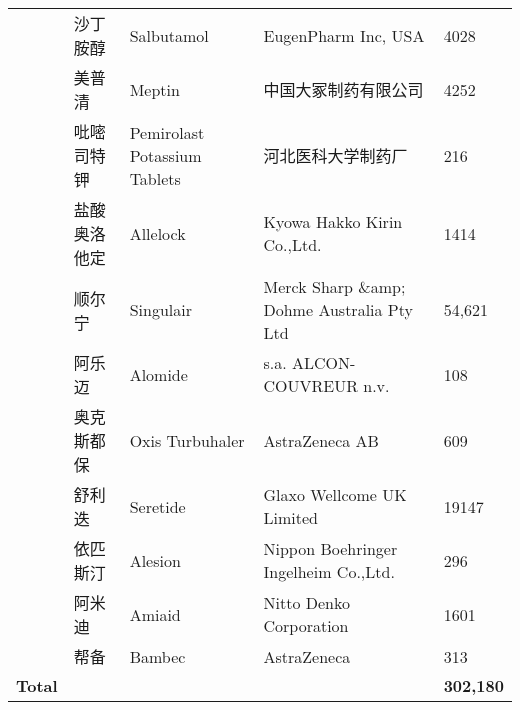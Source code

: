 \begin{longtable}{m{}m{}m{}m{}m{}}
		& 沙丁胺醇 & Salbutamol & EugenPharm Inc, USA & 4028 \\
		& 美普清 & Meptin & 中国大冢制药有限公司 & 4252 \\
		& 吡嘧司特钾 & Pemirolast Potassium Tablets & 河北医科大学制药厂 & 216 \\
		& 盐酸奥洛他定 & Allelock & Kyowa Hakko Kirin Co.,Ltd. & 1414 \\
		& 顺尔宁 & Singulair & Merck Sharp \&amp; Dohme Australia Pty Ltd & 54,621 \\
		& 阿乐迈 & Alomide & s.a. ALCON-COUVREUR n.v. & 108 \\
		& 奥克斯都保 & Oxis Turbuhaler & AstraZeneca AB & 609 \\
		& 舒利迭 & Seretide & Glaxo Wellcome UK Limited & 19147 \\
		& 依匹斯汀 & Alesion & Nippon Boehringer Ingelheim Co.,Ltd. & 296 \\
		& 阿米迪 & Amiaid & Nitto Denko Corporation & 1601 \\
		& 帮备 & Bambec & AstraZeneca & 313 \\
		\hline
		\textbf{Total} & 
		\multicolumn{3}{l}{} 
		& \textbf{302,180} \\
       	\hline
\end{longtable}%


